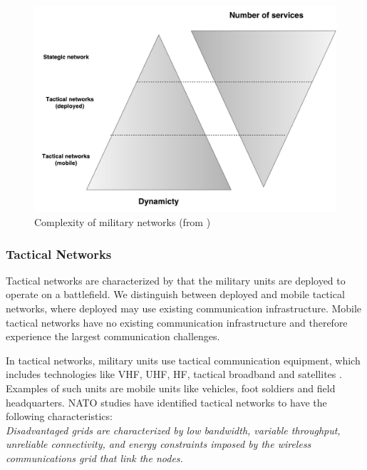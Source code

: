 \begin{figure}[h]
\includegraphics[scale=0.4, left]{images/Network_Complexity.pdf}
\caption{Complexity of military networks (from \cite{pervasive-web})}
\label{figure:military-networks}
\end{figure}

\subsubsection{Tactical Networks}

Tactical networks are characterized by that the military units are deployed to
operate on a battlefield. We distinguish between deployed and mobile tactical
networks, where deployed may use existing communication infrastructure. Mobile
tactical networks have no existing communication infrastructure and therefore
experience the largest communication challenges.

 In tactical networks, military units use tactical communication equipment, which
 includes technologies like VHF, UHF, HF, tactical broadband and satellites
 \cite{ist-090}. Examples of such units are mobile units like vehicles, foot
 soldiers and field headquarters. NATO studies\cite{nato-disadvantaged-grids}
 have identified tactical networks to have the following characteristics: \\

\textit{
Disadvantaged grids are characterized by low bandwidth, variable throughput,
unreliable connectivity, and energy constraints imposed by the wireless
communications grid that link the nodes.
}

\paragraph{}

